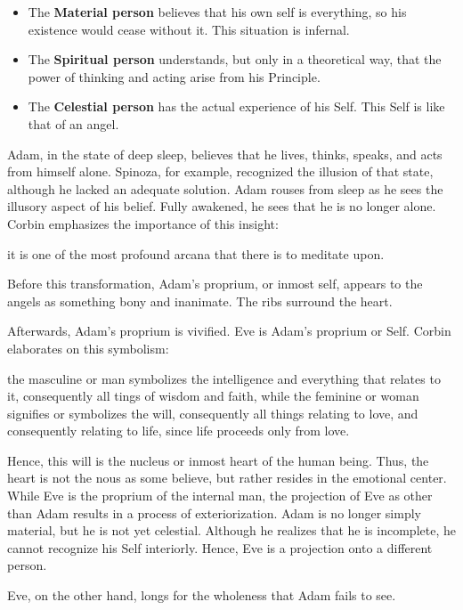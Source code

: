 \begin{itemize}
\item The \textbf{Material person} believes that his own self is everything, so his existence would cease without it. This situation is infernal. 
\item The \textbf{Spiritual person} understands, but only in a theoretical way, that the power of thinking and acting arise from his Principle. 
\item The \textbf{Celestial person} has the actual experience of his Self. This Self is like that of an angel. 
\end{itemize}
Adam, in the state of deep sleep, believes that he lives, thinks, speaks, and acts from himself alone. Spinoza, for example, recognized the illusion of that state, although he lacked an adequate solution. Adam rouses from sleep as he sees the illusory aspect of his belief. Fully awakened, he sees that he is no longer alone. Corbin emphasizes the importance of this insight:

\begin{quotex}
it is one of the most profound arcana that there is to meditate upon.

\end{quotex}
Before this transformation, Adam's proprium, or inmost self, appears to the angels as something bony and inanimate. The ribs surround the heart.

Afterwards, Adam's proprium is vivified. Eve is Adam's proprium or Self. Corbin elaborates on this symbolism:

\begin{quotex}
the masculine or man symbolizes the intelligence and everything that relates to it, consequently all tings of wisdom and faith, while the feminine or woman signifies or symbolizes the will, consequently all things relating to love, and consequently relating to life, since life proceeds only from love.

\end{quotex}
Hence, this will is the nucleus or inmost heart of the human being. Thus, the heart is not the nous as some believe, but rather resides in the emotional center. While Eve is the proprium of the internal man, the projection of Eve as other than Adam results in a process of exteriorization. Adam is no longer simply material, but he is not yet celestial. Although he realizes that he is incomplete, he cannot recognize his Self interiorly. Hence, Eve is a projection onto a different person.

Eve, on the other hand, longs for the wholeness that Adam fails to see.


